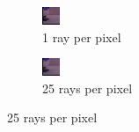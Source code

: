 \begin{figure}[h]
\centering
\begin{subfigure}[b]{0.4\textwidth}
	\includegraphics[width=\textwidth]{./images/renders/no-aa.png}
	\caption{1 ray per pixel}
\end{subfigure}
\begin{subfigure}[b]{0.4\textwidth}
	\includegraphics[width=\textwidth]{./images/renders/aa.png}
	\caption{25 rays per pixel}
\end{subfigure}
\end{figure}

